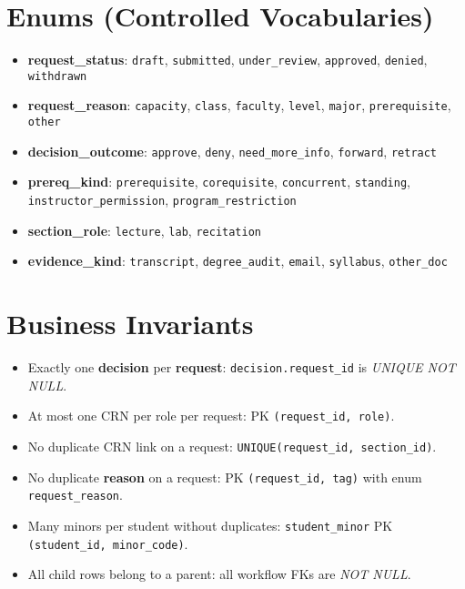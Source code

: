 \documentclass[11pt]{article}
\newcommand{\code}[1]{\texttt{#1}}
\begin{document}
\section*{Enums (Controlled Vocabularies)}
\begin{itemize}
  \item \textbf{request\_status}: \code{draft}, \code{submitted}, \code{under\_review}, \code{approved}, \code{denied}, \code{withdrawn}
  \item \textbf{request\_reason}: \code{capacity}, \code{class}, \code{faculty}, \code{level}, \code{major}, \code{prerequisite}, \code{other}
  \item \textbf{decision\_outcome}: \code{approve}, \code{deny}, \code{need\_more\_info}, \code{forward}, \code{retract}
  \item \textbf{prereq\_kind}: \code{prerequisite}, \code{corequisite}, \code{concurrent}, \code{standing}, \code{instructor\_permission}, \code{program\_restriction}
  \item \textbf{section\_role}: \code{lecture}, \code{lab}, \code{recitation}
  \item \textbf{evidence\_kind}: \code{transcript}, \code{degree\_audit}, \code{email}, \code{syllabus}, \code{other\_doc}
\end{itemize}

\section*{Business Invariants}
\begin{itemize}
  \item Exactly one \textbf{decision} per \textbf{request}: \code{decision.request\_id} is \emph{UNIQUE NOT NULL}.
  \item At most one CRN per role per request: PK \code{(request\_id, role)}.
  \item No duplicate CRN link on a request: \code{UNIQUE(request\_id, section\_id)}.
  \item No duplicate \textbf{reason} on a request: PK \code{(request\_id, tag)} with enum \code{request\_reason}.
  \item Many minors per student without duplicates: \code{student\_minor} PK \code{(student\_id, minor\_code)}.
  \item All child rows belong to a parent: all workflow FKs are \emph{NOT NULL}.
\end{itemize}

\end{document}
